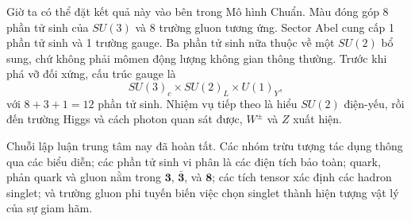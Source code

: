 Giờ ta có thể đặt kết quả này vào bên trong Mô hình Chuẩn. Màu đóng góp 8 phần tử sinh của \(SU(3)\) và 8 trường gluon tương ứng. Sector Abel cung cấp 1 phần tử sinh và 1 trường gauge. Ba phần tử sinh nữa thuộc về một \(SU(2)\) bổ sung, chứ không phải mômen động lượng không gian thông thường. Trước khi phá vỡ đối xứng, cấu trúc gauge là
\begin{equation}
SU(3)_c\times SU(2)_L\times U(1)_Y,
\end{equation}
với \(8+3+1=12\) phần tử sinh. Nhiệm vụ tiếp theo là hiểu \(SU(2)\) điện-yếu, rồi đến trường Higgs và cách photon quan sát được, \(W^\pm\) và \(Z\) xuất hiện.

Chuỗi lập luận trung tâm nay đã hoàn tất. Các nhóm trừu tượng tác dụng thông qua các biểu diễn; các phần tử sinh vi phân là các điện tích bảo toàn; quark, phản quark và gluon nằm trong \(\boldsymbol 3\),
\(\bar{\boldsymbol 3}\), và \(\boldsymbol 8\); các tích tensor xác định các hadron singlet; và trường gluon phi tuyến biến việc chọn singlet thành hiện tượng vật lý của sự giam hãm.